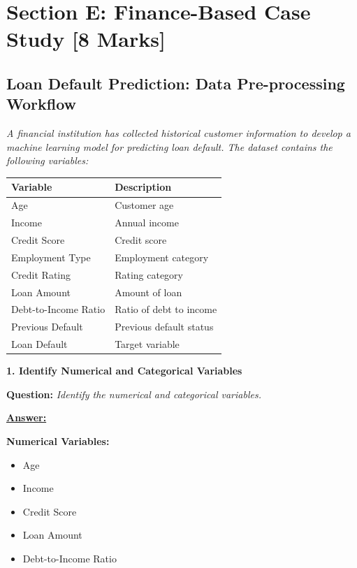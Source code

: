 \documentclass[11pt,a4paper]{article}
\newcommand{\questiontitle}[2]{%
    \vspace{0.4cm}%
    \noindent\textbf{\large\color{headerblue}#1. #2}\par\vspace{0.15cm}%
}
\newcommand{\qprompt}[1]{%
    \noindent\textbf{Question:} \textit{#1}\par\vspace{0.2cm}%
}
\newcommand{\answer}{\noindent\textbf{\underline{Answer:}}\par\vspace{0.15cm}}
\begin{document}
\vspace{0.5cm}

\section*{Section E: Finance-Based Case Study \hfill [8 Marks]}

\subsection*{Loan Default Prediction: Data Pre-processing Workflow}
\noindent\textit{A financial institution has collected historical customer information to develop a machine learning model for predicting loan default. The dataset contains the following variables:}

\begin{center}
\begin{tabular}{ll}
\toprule
\textbf{Variable} & \textbf{Description} \\
\midrule
Age & Customer age \\
Income & Annual income \\
Credit Score & Credit score \\
Employment Type & Employment category \\
Credit Rating & Rating category \\
Loan Amount & Amount of loan \\
Debt-to-Income Ratio & Ratio of debt to income \\
Previous Default & Previous default status \\
Loan Default & Target variable \\
\bottomrule
\end{tabular}
\end{center}

\vspace{0.2cm}

\questiontitle{1}{Identify Numerical and Categorical Variables}
\qprompt{Identify the numerical and categorical variables.}
\answer
\noindent\textbf{Numerical Variables:}
\begin{itemize}
    \item Age
    \item Income
    \item Credit Score
    \item Loan Amount
    \item Debt-to-Income Ratio
\end{itemize}
\end{document}

